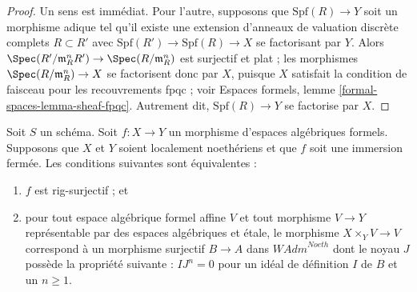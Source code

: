 \begin{proof}
Un sens est immédiat. Pour l'autre, supposons que $\text{Spf}(R) \to Y$
soit un morphisme adique tel qu'il existe une extension d'anneaux de
valuation discrète complets $R \subset R'$ avec
$\text{Spf}(R') \to \text{Spf}(R) \to X$ se factorisant par $Y$. Alors
$\Spec(R'/\mathfrak m_R^n R') \to \Spec(R/\mathfrak m_R^n)$ est surjectif
et plat ; les morphismes $\Spec(R/\mathfrak m_R^n) \to X$ se factorisent donc
par $X$, puisque $X$ satisfait la condition de faisceau pour les recouvrements fpqc ; voir
Espaces formels, lemme \ref{formal-spaces-lemma-sheaf-fpqc}.
Autrement dit, $\text{Spf}(R) \to Y$ se factorise par $X$.
\end{proof}

\begin{lemma}
\label{lemma-closed-immersion-rig-surjective}
Soit $S$ un schéma. Soit $f : X \to Y$ un morphisme d'espaces algébriques
formels. Supposons que $X$ et $Y$ soient localement noethériens et que $f$ soit une
immersion fermée. Les conditions suivantes sont équivalentes :
\begin{enumerate}
\item $f$ est rig-surjectif ; et
\item pour tout espace algébrique formel affine $V$ et tout morphisme
$V \to Y$ représentable par des espaces algébriques et étale,
le morphisme $X \times_Y V \to V$ correspond à un morphisme surjectif
$B \to A$ dans $\textit{WAdm}^{Noeth}$ dont le noyau $J$ possède la propriété
suivante : $IJ^n = 0$ pour un idéal de définition $I$ de $B$
et un $n \geq 1$.
\end{enumerate}
\end{lemma}

